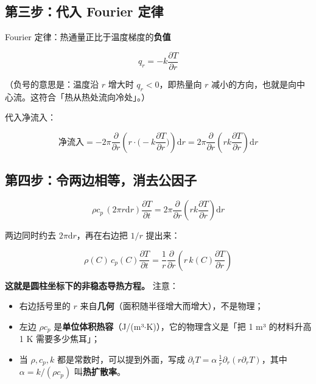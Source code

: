 \subsection{第三步：代入 Fourier 定律}


Fourier 定律：热通量正比于温度梯度的\textbf{负值}


\begin{equation*}
q_r=-k\frac{\partial T}{\partial r}
\end{equation*}


（负号的意思是：温度沿 $r$ 增大时 $q_r<0$，即热量向 $r$ 减小的方向，也就是向中心流。这符合「热从热处流向冷处」。）


代入净流入：


\begin{equation*}
\text{净流入}=-2\pi\frac{\partial}{\partial r}\left(r\cdot\Big(-k\frac{\partial T}{\partial r}\Big)\right)\mathrm{d} r=2\pi\frac{\partial}{\partial r}\left(rk\frac{\partial T}{\partial r}\right)\mathrm{d} r
\end{equation*}


\subsection{第四步：令两边相等，消去公因子}


\begin{equation*}
\rho c_p\,(2\pi r\mathrm{d} r)\frac{\partial T}{\partial t}=2\pi\frac{\partial}{\partial r}\left(rk\frac{\partial T}{\partial r}\right)\mathrm{d} r
\end{equation*}


两边同时约去 $2\pi\mathrm{d} r$，再在右边把 $1/r$ 提出来：


\begin{equation}
\boxed{\ \rho(C)\,c_p(C)\frac{\partial T}{\partial t}=\frac{1}{r}\frac{\partial}{\partial r}\left(r\,k(C)\frac{\partial T}{\partial r}\right)\ }\tag{2.1}
\end{equation}


\textbf{这就是圆柱坐标下的非稳态导热方程。} 注意：


\begin{itemize}
\item 右边括号里的 $r$ 来自\textbf{几何}（面积随半径增大而增大），不是物理；
\item 左边 $\rho c_p$ 是\textbf{单位体积热容}（J/(m³$\cdot$K)），它的物理含义是「把 1 m³ 的材料升高 1 K 需要多少焦耳」；
\item 当 $\rho,c_p,k$ 都是常数时，可以提到外面，写成 $\partial_tT=\alpha\,\frac1r\partial_r(r\partial_rT)$，其中 $\alpha=k/(\rho c_p)$ 叫\textbf{热扩散率}。
\end{itemize}


